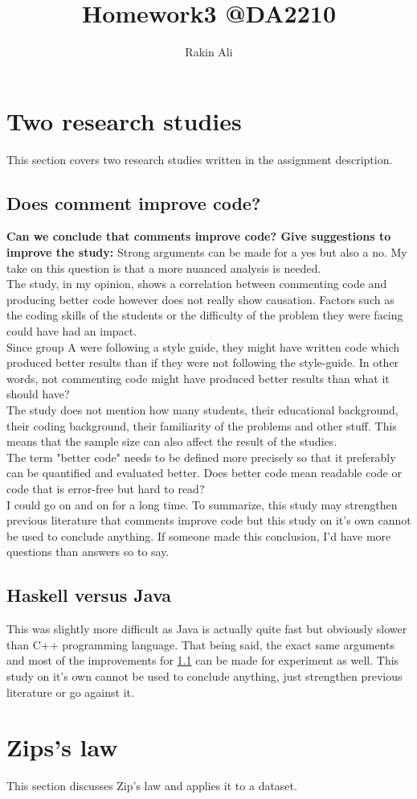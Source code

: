 \documentclass[a4paper,11pt]{article}
\title{Homework3 @DA2210}
\author{Rakin Ali}
\begin{document}
\maketitle

\tableofcontents

\newpage
\section{Two research studies} This section covers two research studies written in the assignment description.

\subsection{Does comment improve code?}
\label{Comments-code}
\textbf{Can we conclude that comments improve code? Give suggestions to improve the study:} Strong arguments can be made for a yes but also a no. My take on this question is that a more nuanced analysis is needed. \\
The study, in my opinion, shows a correlation between commenting code and producing better code however does not really show causation. Factors such as the coding skills of the students or the difficulty of the problem they were facing could have had an impact. \\
Since group A were following a style guide, they might have written code which produced better results than if they were not following the style-guide. In other words, not commenting code might have produced better results than what it should have?\\
The study does not mention how many students, their educational background, their coding background, their familiarity of the problems and other stuff. This means that the sample size can also affect the result of the studies. \\
The term "better code" needs to be defined more precisely so that it preferably can be quantified and evaluated better. Does better code mean readable code or code that is error-free but hard to read?\\
I could go on and on for a long time. To summarize, this study may strengthen previous literature that comments improve code but this study on it's own cannot be used to conclude anything. If someone made this conclusion, I'd have more questions than answers so to say. 

\subsection{Haskell versus Java}
This was slightly more difficult as Java is actually quite fast but obviously slower than C++ programming language. That being said, the exact same arguments and most of the improvements for  \ref{Comments-code} can be made for experiment as well. This study on it's own cannot be used to conclude anything, just strengthen previous literature or go against it.

\section{Zips's law}
This section discusses Zip's law and applies it to a dataset. 

\printbibliography
\end{document}

